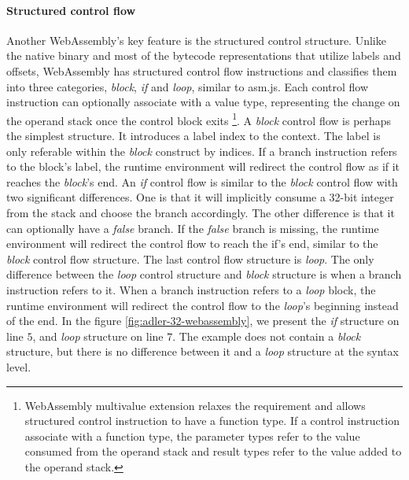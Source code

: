 \paragraph{Structured control flow}
Another WebAssembly's key feature is the structured control structure. Unlike
the native binary and most of the bytecode representations that utilize labels
and offsets, WebAssembly has structured control flow instructions and classifies
them into three categories, \emph{block}, \emph{if} and \emph{loop}, similar to
asm.js. Each control flow instruction can optionally associate with a value
type, representing the change on the operand stack once the control block exits
\footnote{WebAssembly multivalue extension relaxes the requirement and allows
  structured control instruction to have a function type. If a control
  instruction associate with a function type, the parameter types refer to the
  value consumed from the operand stack and result types refer to the value
  added to the operand stack.}. A \emph{block} control flow is perhaps the
simplest structure. It introduces a label index to the context. The label is
only referable within the \emph{block} construct by indices. If a branch
instruction refers to the block's label, the runtime environment will redirect
the control flow as if it reaches the \emph{block}'s end. An \emph{if} control
flow is similar to the \emph{block} control flow with two significant
differences. One is that it will implicitly consume a 32-bit integer from the
stack and choose the branch accordingly. The other difference is that it can
optionally have a \emph{false} branch. If the \emph{false} branch is missing,
the runtime environment will redirect the control flow to reach the {if}'s end,
similar to the \emph{block} control flow structure. The last control flow
structure is \emph{loop}. The only difference between the \emph{loop} control
structure and \emph{block} structure is when a branch instruction refers to it.
When a branch instruction refers to a \emph{loop} block, the runtime environment
will redirect the control flow to the \emph{loop}'s beginning instead of the
end. In the figure \ref{fig:adler-32-webassembly}, we present the \emph{if}
structure on line $5$, and \emph{loop} structure on line $7$. The example does
not contain a \emph{block} structure, but there is no difference between it and
a \emph{loop} structure at the syntax level.

